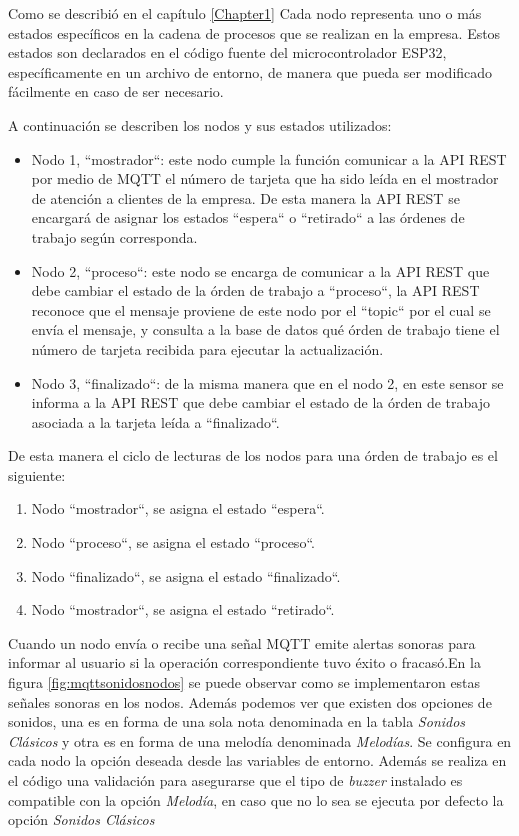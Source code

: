 Como se describió en el capítulo \ref{Chapter1} Cada nodo representa uno o más estados específicos en la cadena de procesos que se realizan en la empresa. Estos estados son declarados en el código fuente del microcontrolador ESP32, específicamente en un archivo de entorno, de manera que pueda ser modificado fácilmente en caso de ser necesario.

A continuación se describen los nodos y sus estados utilizados:

\begin{itemize}
\item Nodo 1, ``mostrador``: este nodo cumple la función comunicar a la API REST por medio de MQTT el número de tarjeta que ha sido leída en el mostrador de atención a clientes de la empresa. De esta manera la API REST se encargará de asignar los estados ``espera`` o ``retirado`` a las órdenes de trabajo según corresponda.

\item Nodo 2, ``proceso``: este nodo se encarga de comunicar a la API REST que debe cambiar el estado de la órden de trabajo a ``proceso``, la API REST reconoce que el mensaje proviene de este nodo por el ``topic`` por el cual se envía el mensaje, y consulta a la base de datos qué órden de trabajo tiene el número de tarjeta recibida para ejecutar la actualización.

\item Nodo 3, ``finalizado``: de la misma manera que en el nodo 2, en este sensor se informa a la API REST que debe cambiar el estado de la órden de trabajo asociada a la tarjeta leída a ``finalizado``.
\end{itemize}

De esta manera el ciclo de lecturas de los nodos para una órden de trabajo es el siguiente: 

\begin{enumerate}
\item Nodo ``mostrador``, se asigna el estado ``espera``.
\item Nodo ``proceso``, se asigna el estado ``proceso``.
\item Nodo ``finalizado``, se asigna el estado ``finalizado``.
\item Nodo ``mostrador``, se asigna el estado ``retirado``.
\end{enumerate}

Cuando un nodo envía o recibe una señal MQTT emite alertas sonoras para informar al usuario si la operación correspondiente tuvo éxito o fracasó.En la figura \ref{fig:mqttsonidosnodos} se puede observar como se implementaron estas señales sonoras en los nodos. Además podemos ver que existen dos opciones de sonidos, una es en forma de una sola nota denominada en la tabla \textit{Sonidos Clásicos} y otra es en forma de una melodía denominada \textit{Melodías}. Se configura en cada nodo la opción deseada desde las variables de entorno. Además se realiza en el código una validación para asegurarse que el tipo de \textit{buzzer} instalado es compatible con la opción \textit{Melodía}, en caso que no lo sea se ejecuta por defecto la opción \textit{Sonidos Clásicos}

